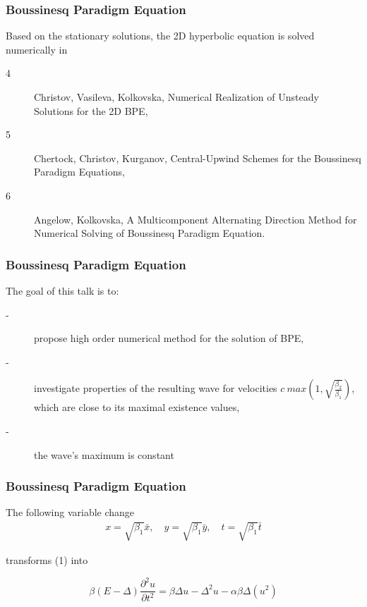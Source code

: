 \documentclass{beamer}
\newcommand{\be}{\begin{equation}}
\newcommand{\ee}{\end{equation}}
\begin{document}

\begin{frame}
\frametitle{Boussinesq Paradigm Equation}


Based on the stationary solutions, the 2D hyperbolic equation is solved numerically in 
\begin{description}
 \item[4] Christov, Vasileva, Kolkovska, Numerical Realization of Unsteady Solutions for the 2D BPE,
 \item[5] Chertock, Christov, Kurganov, Central-Upwind Schemes for the Boussinesq Paradigm Equations, 
  \item[6] Angelow, Kolkovska, A Multicomponent Alternating Direction Method for Numerical Solving of Boussinesq Paradigm Equation.
\end{description}
\end{frame}


\begin{frame}
\frametitle{Boussinesq Paradigm Equation}

The goal of this talk is to:
\begin{description}
 \item[-] propose high order numerical method for the solution of BPE,
 \item[-] investigate properties of the resulting wave for velocities $c ~ max(1, \sqrt{ \frac{\beta_2}{\beta_1} } )$, which are close to its maximal existence values,
 \item[-] the wave's maximum is constant
\end{description}
\end{frame}


\begin{frame}
\frametitle{Boussinesq Paradigm Equation}
The following variable change
\begin{align}
x = \sqrt{\beta_1} \bar{x}, \quad y = \sqrt{\beta_1} \bar{y}, \quad t = \sqrt{\beta_1} \bar{t}
\end{align}

transforms (1) into 

\be\label{problem}
\beta(E-\Delta) \frac{\partial^2 u}{\partial t^2}=
 \beta \Delta u -\Delta^2 u -\alpha \beta \Delta (u^2)
\ee

\end{frame}
\end{document}
